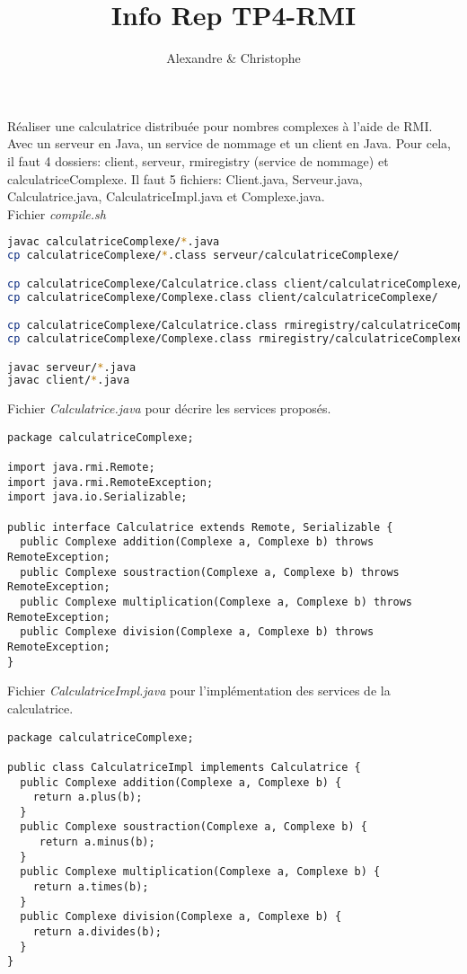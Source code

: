 \documentclass{article}
\title{\vspace{-5ex}Info Rep TP4-RMI\vspace{-2ex}}
\author{Alexandre \bsc{Brehmer} \& Christophe \bsc{Cluizel}}
\begin{document}
\maketitle
\vspace{-6ex}
Réaliser une calculatrice distribuée pour nombres complexes à l'aide de RMI\@. Avec un serveur en Java, un service de nommage et un client en Java. Pour cela, il faut 4 dossiers: client, serveur, rmiregistry (service de nommage) et calculatriceComplexe. Il faut 5 fichiers: Client.java, Serveur.java, Calculatrice.java, CalculatriceImpl.java et Complexe.java. \\

Fichier \emph{compile.sh}
\vspace{-1.5ex}
\begin{lstlisting}[language=bash]
javac calculatriceComplexe/*.java
cp calculatriceComplexe/*.class serveur/calculatriceComplexe/

cp calculatriceComplexe/Calculatrice.class client/calculatriceComplexe/
cp calculatriceComplexe/Complexe.class client/calculatriceComplexe/

cp calculatriceComplexe/Calculatrice.class rmiregistry/calculatriceComplexe/
cp calculatriceComplexe/Complexe.class rmiregistry/calculatriceComplexe/

javac serveur/*.java
javac client/*.java
\end{lstlisting}
\vspace{-1ex}

Fichier \emph{Calculatrice.java} pour décrire les services proposés.
\begin{lstlisting}
package calculatriceComplexe;

import java.rmi.Remote;
import java.rmi.RemoteException;
import java.io.Serializable;

public interface Calculatrice extends Remote, Serializable {
  public Complexe addition(Complexe a, Complexe b) throws RemoteException;
  public Complexe soustraction(Complexe a, Complexe b) throws RemoteException;
  public Complexe multiplication(Complexe a, Complexe b) throws RemoteException;
  public Complexe division(Complexe a, Complexe b) throws RemoteException;
}
\end{lstlisting}

Fichier \emph{CalculatriceImpl.java} pour l'implémentation des services de la calculatrice.
\begin{lstlisting}
package calculatriceComplexe;

public class CalculatriceImpl implements Calculatrice {
  public Complexe addition(Complexe a, Complexe b) {
    return a.plus(b);
  }
  public Complexe soustraction(Complexe a, Complexe b) {
     return a.minus(b);
  }
  public Complexe multiplication(Complexe a, Complexe b) {
    return a.times(b);
  }
  public Complexe division(Complexe a, Complexe b) {
    return a.divides(b);
  }
}
\end{lstlisting}
\end{document}
